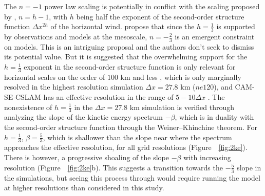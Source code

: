 \documentclass[times]{qjrms4}
\begin{document}
The $n=-1$ power law scaling is potentially in conflict with the scaling proposed by \cite{RETAL2016CD}, $n=h-1$, with $h$ being half the exponent of the second-order structure function $\Delta x^{2h}$ of the horizontal wind. \cite{RETAL2016CD} propose that since the $h=\frac{1}{3}$ is supported by observations and models at the mesoscale, $n=-\frac{2}{3}$ is an emergent constraint on models. This is an intriguing proposal and the authors don't seek to dismiss its potential value. But it is suggested that the overwhelming support for the $h=\frac{1}{3}$ exponent in the second-order structure function is only relevant for horizontal scales on the order of $100$ km and less \citep{L1999JFM,CL2001JGR}, which is only marginally resolved in the highest resolution simulation $\Delta x=27.8$ km ($ne120$), and CAM-SE-CSLAM has an effective resolution in the range of $5-10\Delta x$ \citep{HETAL2019JAMES}. The nonexistence of $h=\frac{1}{3}$ in the $\Delta x=27.8$ km simulation is verified through analyzing the slope of the kinetic energy spectrum $-\beta$, which is in duality with the second-order structure function through the Weiner–Khinchine theorem. For $h=\frac{1}{3}$, $\beta=\frac{5}{3}$, which is shallower than the slope near where the spectrum approaches the effective resolution, for all grid resolutions (Figure~~\ref{fig:2ke}). There is however, a progressive shoaling of the slope $-\beta$ with increasing resolution (Figure~~\ref{fig:2ke}b). This suggests a transition towards the $-\frac{5}{3}$ slope in the simulations, but seeing this process through would require running the model at higher resolutions than considered in this study.
\end{document}

